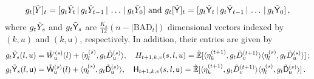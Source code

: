 \documentclass[11pt]{article}
\numberwithin{equation}{section}
\begin{document}
\begin{align*}
    g_t[\Tilde{Y}]_t = [ g_t \Tilde{Y}_t \, | \,g_t \Tilde{Y}_{t-1} \,|\, \ldots \,|\, g_t \Tilde{Y}_0 ] \mbox{ and } g_t [\Tilde{\mathsf{Y}}]_t = [ g_t\Tilde{\mathsf{Y}}_t \,|\, g_t\Tilde{\mathsf{Y}}_{t-1} \,|\, \ldots \,|\, g_t\Tilde{\mathsf{Y}}_0 ] \,,
\end{align*}
where $g_t \Tilde{Y}_s$ and $g_t \Tilde{\mathsf{Y}}_s$ are $\frac{K_s}{12}(n-|\mathrm{BAD}_t|)$ dimensional vectors indexed by $(k,u)$ and $(k,\mathsf{u})$, respectively. In addition, their entries are given by
\begin{equation*}
\begin{aligned}
    & g_t \Tilde{Y}_s (l,u) = \Tilde{W}^{(s)}_u(l) +  \langle \eta^{(s)}_l, g_t \Tilde{D}^{(s)}_u \rangle, \quad  H_{t+1,k,v} ( s,l,u ) = \Hat{\mathbb{E}}[\langle \eta^{(t+1)}_k, g_t\Tilde{D}^{(t+1)}_v \rangle \langle \eta^{(s)}_l, g_t \Tilde{D}^{(s)}_{{u}} \rangle]\,; \\
    & g_t\Tilde{\mathsf{Y}}_s (l,\mathsf{u}) =  \Tilde{\mathsf{W}}^{(s)}_{\mathsf{u}}(l) + \langle \eta^{(s)}_l, g_t \Tilde{\mathsf{D}}^{(s)}_{\mathsf{u}} \rangle, \quad \mathsf{H}_{t+1,k,v} (s,l,\mathsf{u}) = \Hat{\mathbb{E}}[\langle \eta^{(t+1)}_k, g_t\Tilde{D}^{(t+1)}_v \rangle \langle \eta^{(s)}_l, g_t\Tilde{\mathsf{D}}^{(s)}_{\mathsf{u}} \rangle] \,.
\end{aligned}
\end{equation*}
\end{document}
